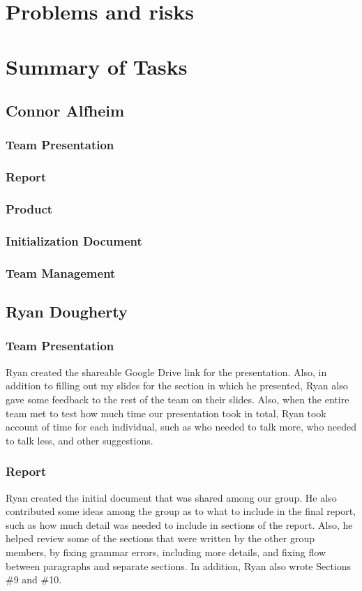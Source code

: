 \documentclass[12pt]{article}
\begin{document}
\begin{spacing}{1.5}
\section{Problems and risks}

\section{Summary of Tasks}

\subsection{Connor Alfheim}
\subsubsection{Team Presentation}
\subsubsection{Report}
\subsubsection{Product}
\subsubsection{Initialization Document}
\subsubsection{Team Management}

\clearpage

\subsection{Ryan Dougherty}
\subsubsection{Team Presentation}
Ryan created the shareable Google Drive link for the presentation. Also, in addition to filling out my slides for the section in which he presented, Ryan also gave some feedback to the rest of the team on their slides. Also, when the entire team met to test how much time our presentation took in total, Ryan took account of time for each individual, such as who needed to talk more, who needed to talk less, and other suggestions.
\subsubsection{Report}
Ryan created the initial document that was shared among our group. He also contributed some ideas among the group as to what to include in the final report, such as how much detail was needed to include in sections of the report. Also, he helped review some of the sections that were written by the other group members, by fixing grammar errors, including more details, and fixing flow between paragraphs and separate sections. In addition, Ryan also wrote Sections \#9 and \#10.

\end{spacing}
\end{document}
